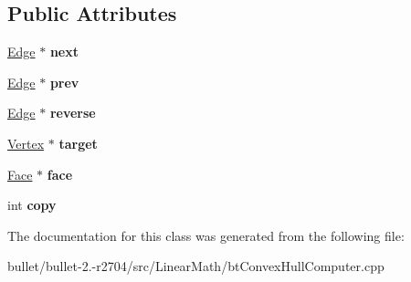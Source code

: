 \subsection*{Public Attributes}
\begin{DoxyCompactItemize}
\item 
\hypertarget{classbt_convex_hull_internal_1_1_edge_aade5504aee3a33713112ce86b35d287b}{\hyperlink{classbt_convex_hull_internal_1_1_edge}{Edge} $\ast$ {\bfseries next}}\label{classbt_convex_hull_internal_1_1_edge_aade5504aee3a33713112ce86b35d287b}

\item 
\hypertarget{classbt_convex_hull_internal_1_1_edge_a2cf4227677ef0fbd89324445696a8d52}{\hyperlink{classbt_convex_hull_internal_1_1_edge}{Edge} $\ast$ {\bfseries prev}}\label{classbt_convex_hull_internal_1_1_edge_a2cf4227677ef0fbd89324445696a8d52}

\item 
\hypertarget{classbt_convex_hull_internal_1_1_edge_a3d8d29a8c597277bc97d16e7c09c5587}{\hyperlink{classbt_convex_hull_internal_1_1_edge}{Edge} $\ast$ {\bfseries reverse}}\label{classbt_convex_hull_internal_1_1_edge_a3d8d29a8c597277bc97d16e7c09c5587}

\item 
\hypertarget{classbt_convex_hull_internal_1_1_edge_ad734b210039c6610fcc21e668be73a21}{\hyperlink{classbt_convex_hull_internal_1_1_vertex}{Vertex} $\ast$ {\bfseries target}}\label{classbt_convex_hull_internal_1_1_edge_ad734b210039c6610fcc21e668be73a21}

\item 
\hypertarget{classbt_convex_hull_internal_1_1_edge_ab1467d5a94858b0631eb795f3e3aa961}{\hyperlink{classbt_convex_hull_internal_1_1_face}{Face} $\ast$ {\bfseries face}}\label{classbt_convex_hull_internal_1_1_edge_ab1467d5a94858b0631eb795f3e3aa961}

\item 
\hypertarget{classbt_convex_hull_internal_1_1_edge_a1c4a1b019fab0a142f09955eb58e69c7}{int {\bfseries copy}}\label{classbt_convex_hull_internal_1_1_edge_a1c4a1b019fab0a142f09955eb58e69c7}

\end{DoxyCompactItemize}


The documentation for this class was generated from the following file\+:\begin{DoxyCompactItemize}
\item 
bullet/bullet-\/2.-\/r2704/src/\+Linear\+Math/bt\+Convex\+Hull\+Computer.\+cpp\end{DoxyCompactItemize}
